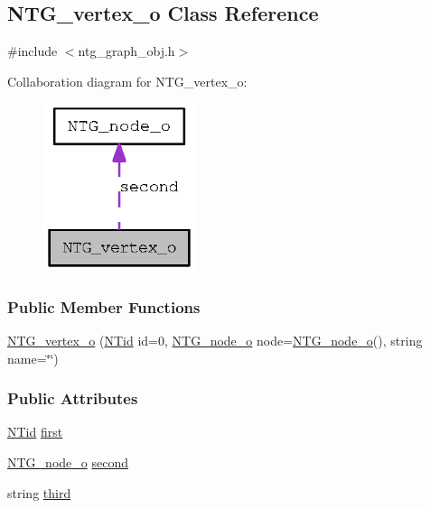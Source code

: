\subsection{NTG\_\-vertex\_\-o Class Reference}
\label{class_n_t_g__vertex__o}


{\ttfamily \#include $<$ntg\_\-graph\_\-obj.h$>$}



Collaboration diagram for NTG\_\-vertex\_\-o:
\nopagebreak
\begin{figure}[H]
\begin{center}
\leavevmode
\includegraphics[width=126pt]{class_n_t_g__vertex__o__coll__graph}
\end{center}
\end{figure}
\subsubsection*{Public Member Functions}
\begin{DoxyCompactItemize}
\item 
\hyperlink{class_n_t_g__vertex__o_a9c39bee3d2dc7f9a2d4a5ad75dc09c89}{NTG\_\-vertex\_\-o} (\hyperlink{nt__types_8h_ab5cab5f78fdd2211c340cbe527a4afd7}{NTid} id=0, \hyperlink{class_n_t_g__node__o}{NTG\_\-node\_\-o} node=\hyperlink{class_n_t_g__node__o}{NTG\_\-node\_\-o}(), string name=\char`\"{}\char`\"{})
\end{DoxyCompactItemize}
\subsubsection*{Public Attributes}
\begin{DoxyCompactItemize}
\item 
\hyperlink{nt__types_8h_ab5cab5f78fdd2211c340cbe527a4afd7}{NTid} \hyperlink{class_n_t_g__vertex__o_a2c3ea9e94130a41f20b4eed7cf481ba6}{first}
\item 
\hyperlink{class_n_t_g__node__o}{NTG\_\-node\_\-o} \hyperlink{class_n_t_g__vertex__o_a46436455833920f013bb5d07f5ccd4e5}{second}
\item 
string \hyperlink{class_n_t_g__vertex__o_a39dc9c1f1c6becfd552f62702c51d714}{third}
\end{DoxyCompactItemize}


